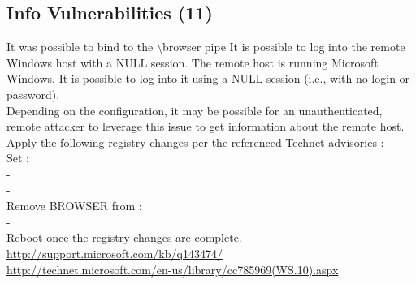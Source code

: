 
\subsection{Info Vulnerabilities (11)}
\begin{tcolorbox}[
	title=Microsoft Windows SMB NULL Session Authentication - Nessus Plugin ID 26920,
	colback=green!5!white,
	colframe=green!75!black,
	subtitle style={boxrule=0.4pt, colback=green!50!white}	
	] 
	It was possible to bind to the \textbackslash browser pipe
It is possible to log into the remote Windows host with a NULL session.
The remote host is running Microsoft Windows. It is possible to log into it using a NULL session (i.e., with no login or password).\\
Depending on the configuration, it may be possible for an unauthenticated, remote attacker to leverage this issue to get information about the remote host.
Apply the following registry changes per the referenced Technet advisories :\\
Set :\\
-\\
-\\
Remove BROWSER from :\\
-\\ 
Reboot once the registry changes are complete.
\url{http://support.microsoft.com/kb/q143474/}\\
\url{http://technet.microsoft.com/en-us/library/cc785969(WS.10).aspx}
\end{tcolorbox}